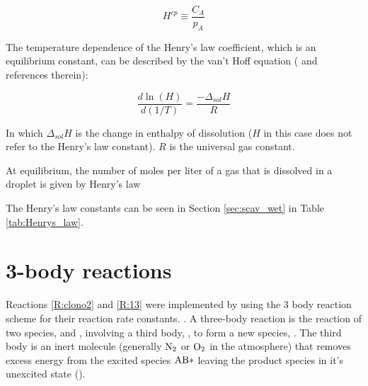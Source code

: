 \begin{equation}
    H^{cp} \equiv \frac{C_A}{p_A}
    \label{eq:HenrySol}
\end{equation}

The temperature dependence of the Henry's law coefficient, which is an equilibrium constant, can be described by the van't Hoff equation (\cite{Sander2015} and references therein): 

\begin{equation*}
    \frac{d\ln(H)}{d(1/T)} = \frac{-\Delta_{sol}H}{R}
    \label{eq:vantHoff}
\end{equation*}

In which $\Delta_{sol}H$ is the change in enthalpy of dissolution ($H$ in this case does not refer to the Henry's law constant). $R$ is the universal gas constant. 


At equilibrium, the number of moles per liter of a gas that is dissolved in a droplet is given by Henry's law


The Henry's law constants can be seen in Section \ref{sec:scav_wet} in Table \ref{tab:Henrys_law}. 


\section{3-body reactions}\label{sec:3Body_theory}


Reactions \ref{R:clono2} and \ref{R:13} were implemented by using the 3 body reaction scheme for their reaction rate constants. \cite{SovdeManual}. A three-body reaction is the reaction of two species,  and , involving a third body, , to form a new species, . The third body is an inert molecule (generally $\mathrm{N_2}$ or $\mathrm{O_2}$ in the atmosphere) that removes excess energy from the excited species $\mathrm{AB*}$ leaving the product species  in it's unexcited state (\cite{Jacob1999}).